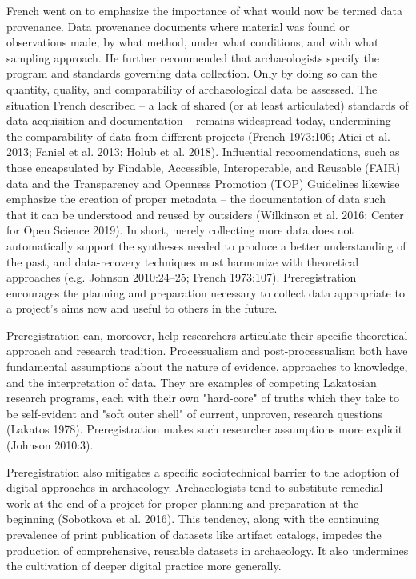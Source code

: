 \documentclass[article]{sa}
\begin{document}
French went on to emphasize the importance of what would now be termed
data provenance. Data provenance documents where material was found or
observations made, by what method, under what conditions, and with what
sampling approach. He further recommended that archaeologists specify
the program and standards governing data collection. Only by doing so
can the quantity, quality, and comparability of archaeological data be
assessed. The situation French described -- a lack of shared (or at
least articulated) standards of data acquisition and documentation --
remains widespread today, undermining the comparability of data from
different projects (French 1973:106; Atici et al. 2013; Faniel et al.
2013; Holub et al. 2018). Influential recoomendations, such as those
encapsulated by Findable, Accessible, Interoperable, and Reusable (FAIR)
data and the Transparency and Openness Promotion (TOP) Guidelines
likewise emphasize the creation of proper metadata -- the
documentation of data such that it can be understood and reused by
outsiders (Wilkinson et al. 2016; Center for Open Science 2019). In
short, merely collecting more data does not automatically support the
syntheses needed to produce a better understanding of the past, and
data-recovery techniques must harmonize with theoretical approaches
(e.g. Johnson 2010:24--25; French 1973:107). Preregistration encourages
the planning and preparation necessary to collect data appropriate to a
project's aims now and useful to others in the future.

Preregistration can, moreover, help researchers articulate their
specific theoretical approach and research tradition. Processualism and
post-processualism both have fundamental assumptions about the nature of
evidence, approaches to knowledge, and the interpretation of data. They
are examples of competing Lakatosian research programs, each with their
own "hard-core" of truths which they take to be self-evident and "soft
outer shell" of current, unproven, research questions (Lakatos 1978).
Preregistration makes such researcher assumptions more explicit (Johnson
2010:3).

Preregistration also mitigates a specific sociotechnical barrier to the
adoption of digital approaches in archaeology. Archaeologists tend to
substitute remedial work at the end of a project for proper planning and
preparation at the beginning (Sobotkova et al. 2016). This tendency,
along with the continuing prevalence of print publication of datasets
like artifact catalogs, impedes the production of comprehensive,
reusable datasets in archaeology. It also undermines the cultivation of
deeper digital practice more generally.
\end{document}
